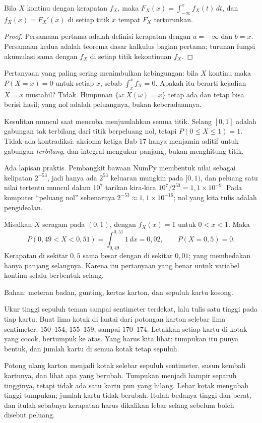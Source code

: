 \begin{teorema}
Bila $X$ kontinu dengan kerapatan $f_X$, maka $F_X(x)=\int_{-\infty}^{x}f_X(t)\,dt$,
dan $f_X(x)=F_X'(x)$ di setiap titik $x$ tempat $F_X$ terturunkan.
\end{teorema}

\begin{proof}
Persamaan pertama adalah definisi kerapatan dengan $a=-\infty$ dan $b=x$. Persamaan
kedua adalah teorema dasar kalkulus bagian pertama: turunan fungsi akumulasi sama
dengan $f_X$ di setiap titik kekontinuan $f_X$.
\end{proof}

Pertanyaan yang paling sering menimbulkan kebingungan: bila $X$ kontinu maka
$P(X=x)=0$ untuk setiap $x$, sebab $\int_x^x f_X=0$. Apakah itu berarti kejadian $X=x$
mustahil? Tidak. Himpunan $\{\omega:X(\omega)=x\}$ tetap ada dan tetap bisa berisi
hasil; yang nol adalah peluangnya, bukan keberadaannya.

Kesulitan muncul saat mencoba menjumlahkan semua titik. Selang $[0,1]$ adalah gabungan
tak terbilang dari titik berpeluang nol, tetapi $P(0\le X\le1)=1$. Tidak ada
kontradiksi: aksioma ketiga Bab 17 hanya menjamin aditif untuk gabungan
\emph{terbilang}, dan integral mengukur panjang, bukan menghitung titik.

Ada lapisan praktis. Pembangkit bawaan NumPy membentuk nilai
sebagai kelipatan $2^{-53}$, jadi hanya ada $2^{53}$ keluaran mungkin pada $[0,1)$, dan
peluang satu nilai tertentu muncul dalam $10^7$ tarikan kira-kira
$10^7/2^{53}=1{,}1\times10^{-9}$. Pada komputer ``peluang nol'' sebenarnya
$2^{-53}\approx1{,}1\times10^{-16}$; nol yang kita tulis adalah pengidealan.

\begin{contoh}
Misalkan $X$ seragam pada $(0,1)$, dengan $f_X(x)=1$ untuk $0<x<1$. Maka
\[
P(0{,}49<X<0{,}51)=\int_{0{,}49}^{0{,}51}1\,dx=0{,}02,
\qquad P(X=0{,}5)=0 .
\]
Kerapatan di sekitar $0{,}5$ sama besar dengan di sekitar $0{,}01$; yang membedakan
hanya panjang selangnya. Karena itu pertanyaan yang benar untuk variabel kontinu
selalu berbentuk selang.
\end{contoh}

\begin{tangan}
Bahan: meteran badan, gunting, kertas karton, dan sepuluh kartu kosong.

Ukur tinggi sepuluh teman sampai sentimeter terdekat, lalu tulis satu tinggi pada tiap
kartu. Buat lima kotak di lantai dari potongan karton selebar lima sentimeter:
$150$--$154$, $155$--$159$, sampai $170$--$174$. Letakkan setiap kartu di kotak yang
cocok, bertumpuk ke atas. Yang harus kita lihat: tumpukan itu punya bentuk, dan jumlah
kartu di semua kotak tetap sepuluh.

Potong ulang karton menjadi kotak selebar sepuluh sentimeter, susun kembali kartunya,
dan lihat apa yang berubah. Tumpukan menjadi hampir separuh tingginya, tetapi tidak ada
satu kartu pun yang hilang. Lebar kotak mengubah tinggi tumpukan; jumlah kartu tidak
berubah. Itulah bedanya tinggi dan berat, dan itulah sebabnya kerapatan harus dikalikan
lebar selang sebelum boleh disebut peluang.
\end{tangan}

